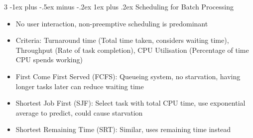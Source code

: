 \documentclass[10pt, landscape]{article}
\makeatletter
\renewcommand{\subsection}{\@startsection{subsection}{3}{0mm}%
                                {-1ex plus -.5ex minus -.2ex}%
                                {1ex plus .2ex}%
                                {\normalfont\small\bfseries}}%
\makeatother
\begin{document}
\begin{multicols*}{3}
\subsection{Scheduling for Batch Processing}
\begin{itemize}
    \item No user interaction, non-preemptive scheduling is predominant
    \item Criteria: Turnaround time (Total time taken, considers waiting time), Throughput (Rate of task completion), CPU Utilisation (Percentage of time CPU spends working)
    \item First Come First Served (FCFS): Queueing system, no starvation, having longer tasks later can reduce waiting time
    \item Shortest Job First (SJF): Select task with total CPU time, use exponential average to predict, could cause starvation
    \item Shortest Remaining Time (SRT): Similar, uses remaining time instead
\end{itemize}


\end{multicols*}
\end{document}
